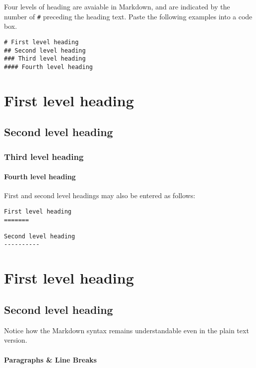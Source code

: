 \documentclass{article}
\begin{document}
    Four levels of heading are avaiable in Markdown, and are indicated by
the number of \texttt{\#} preceding the heading text. Paste the
following examples into a code box.

    \begin{verbatim}
# First level heading
## Second level heading
### Third level heading
#### Fourth level heading
\end{verbatim}

    \section{First level heading}\label{first-level-heading}

\subsection{Second level heading}\label{second-level-heading}

\subsubsection{Third level heading}\label{third-level-heading}

\paragraph{Fourth level heading}\label{fourth-level-heading}

    First and second level headings may also be entered as follows:

\begin{verbatim}
First level heading
=======

Second level heading
----------
\end{verbatim}

    \section{First level heading}\label{first-level-heading}

\subsection{Second level heading}\label{second-level-heading}

    Notice how the Markdown syntax remains understandable even in the plain
text version.

    \paragraph{Paragraphs \& Line Breaks}\label{paragraphs-line-breaks}
\end{document}
